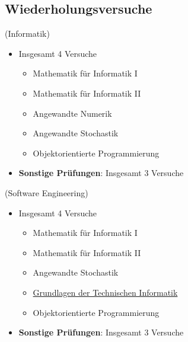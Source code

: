\documentclass[
	aspectratio=169, 
	10pt 
]{beamer}
\begin{document}
\subsection{Wiederholungsversuche}
\begin{frame}{\insertsubsection \space (Informatik)}
    \begin{itemize}
        \item Insgesamt 4 Versuche \footnotemark[1] \begin{itemize} 
            \item Mathematik für Informatik I
            \item Mathematik für Informatik II
            \item Angewandte Numerik
            \item Angewandte Stochastik
            \item Objektorientierte Programmierung \end{itemize}
        \item \textbf{Sonstige Prüfungen}: Insgesamt 3 Versuche
    \end{itemize}

\end{frame}

\begin{frame}{\insertsubsection \space (Software Engineering)}
    \begin{itemize}
        \item Insgesamt 4 Versuche \footnotemark[1] \begin{itemize} 
            \item Mathematik für Informatik I
            \item Mathematik für Informatik II
            \item Angewandte Stochastik
            \item \underline{Grundlagen der Technischen Informatik}
            \item Objektorientierte Programmierung \end{itemize}
        \item \textbf{Sonstige Prüfungen}: Insgesamt 3 Versuche
    \end{itemize}

\end{frame}
\end{document}
